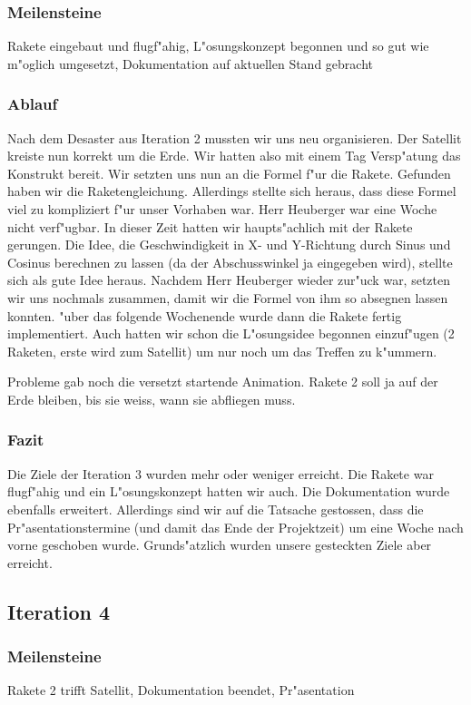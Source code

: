 \documentclass[11pt]{report}
\begin{document}
\subsubsection{Meilensteine}
Rakete eingebaut und flugf"ahig, L"osungskonzept begonnen und so gut wie m"oglich umgesetzt, Dokumentation auf aktuellen Stand gebracht
\subsubsection{Ablauf}
Nach dem Desaster aus Iteration 2 mussten wir uns neu organisieren. Der Satellit kreiste nun korrekt um die Erde. Wir hatten also mit einem Tag Versp"atung das Konstrukt bereit. Wir setzten uns nun an die Formel f"ur die Rakete. Gefunden haben wir die Raketengleichung. Allerdings stellte sich heraus, dass diese Formel viel zu kompliziert f"ur unser Vorhaben war.
Herr Heuberger war eine Woche nicht verf"ugbar. In dieser Zeit hatten wir haupts"achlich mit der Rakete gerungen. Die Idee, die Geschwindigkeit in X- und Y-Richtung durch Sinus und Cosinus berechnen zu lassen (da der Abschusswinkel ja eingegeben wird), stellte sich als gute Idee heraus. Nachdem Herr Heuberger wieder zur"uck war, setzten wir uns nochmals zusammen, damit wir die Formel von ihm so absegnen lassen konnten. "uber das folgende Wochenende wurde dann die Rakete fertig implementiert. Auch hatten wir schon die L"osungsidee begonnen einzuf"ugen (2 Raketen, erste wird zum Satellit) um nur noch um das Treffen zu k"ummern.
\linebreak

Probleme gab noch die versetzt startende Animation. Rakete 2 soll ja auf der Erde bleiben, bis sie weiss, wann sie abfliegen muss. 
\subsubsection{Fazit}
Die Ziele der Iteration 3 wurden mehr oder weniger erreicht. Die Rakete war flugf"ahig und ein L"osungskonzept hatten wir auch. Die Dokumentation wurde ebenfalls erweitert. Allerdings sind wir auf die Tatsache gestossen, dass die Pr"asentationstermine (und damit das Ende der Projektzeit) um eine Woche nach vorne geschoben wurde. 
Grunds"atzlich wurden unsere gesteckten Ziele aber erreicht.
\newpage
\subsection{Iteration 4}
\subsubsection{Meilensteine}
Rakete 2 trifft Satellit, Dokumentation beendet, Pr"asentation
\end{document}
